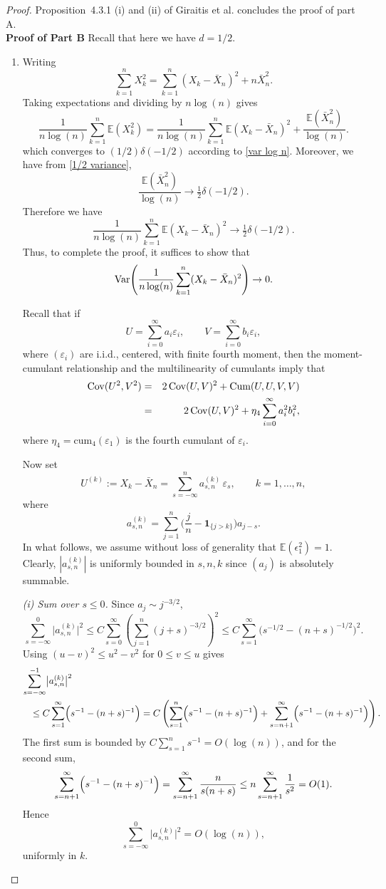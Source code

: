 \documentclass[12pt]{article}
\numberwithin{equation}{section}
\newcommand{\Cov}{{\rm Cov}}
\newcommand{\Var}{{\rm Var}}
\begin{document}
\begin{proof}
  Proposition~4.3.1 (i) and (ii) of Giraitis et al. concludes the proof of part A.\\
  {\bf Proof of Part B} Recall that here we have $d=1/2.$
\begin{enumerate}
    \item
Writing
\[
\sum_{k=1}^n X_k^2
=\sum_{k=1}^n (X_k-\bar X_n)^2+n\bar X_n^2.
\] Taking expectations and dividing by $n\log(n)$ gives
\[
\frac{1}{n\log(n)}\sum_{k=1}^n \mathbb E(X_k^2)
=
\frac{1}{n\log(n)}\sum_{k=1}^n \mathbb E(X_k-\bar X_n)^2
+\frac{\mathbb E(\bar X_n^2)}{\log(n)}.
\]
which converges to $(1/2)\delta(-1/2)$ according to \eqref{var log n}.
Moreover, we have from \eqref{1/2 variance},
\[
\frac{\mathbb E(\bar X_n^2)}{\log(n)}\to \tfrac12\delta(-1/2).
\]
Therefore we have
\[
\frac{1}{n\log(n)}\sum_{k=1}^n \mathbb E(X_k-\bar X_n)^2\to \tfrac12\delta(-1/2).
\]
Thus, to complete the proof, it suffices to show that
\begin{equation}\label{lim var}
\Var\!\left(
\frac{1}{n\log(n)}\sum_{k=1}^n (X_k-\bar X_n)^2
\right)\to0.
\end{equation}

Recall that if
\[
U=\sum_{i=0}^\infty a_i\varepsilon_i,
\qquad
V=\sum_{i=0}^\infty b_i\varepsilon_i,
\]
where $(\varepsilon_i)$ are i.i.d., centered, with finite fourth moment, then  the moment-cumulant relationship and the multilinearity of cumulants imply that
\begin{eqnarray*}
\Cov(U^2,V^2)&=&2\,\Cov(U,V)^2+\textrm{Cum}(U,U,V,V)\\
&=&2\,\Cov(U,V)^2+\eta_4\sum_{i=0}^\infty a_i^2 b_i^2,
\end{eqnarray*}
where $\eta_4=\textrm{cum}_4(\varepsilon_1)$ is the fourth cumulant of $\varepsilon_i$.

Now set
\[
U^{(k)}:=X_k-\bar X_n
=\sum_{s=-\infty}^n a_{s,n}^{(k)}\,\varepsilon_s,
\qquad k=1,\dots,n,
\]
where
\[
a_{s,n}^{(k)}
=\sum_{j=1}^n\Big(\frac{j}{n}-\mathbf 1_{\{j>k\}}\Big)a_{j-s}.
\]
In what follows, we assume without loss of generality that $\mathbb{E}(\epsilon_1^2)=1.$
Clearly, $|a_{s,n}^{(k)}|$ is uniformly bounded in $s,n,k$ since $(a_j)$ is absolutely summable.

\medskip
\noindent\emph{(i) Sum over $s\le0$.}
Since $a_j\sim j^{-3/2}$,
\[
\sum_{s=-\infty}^{0}\bigl|a_{s,n}^{(k)}\bigr|^2
\le
C\sum_{s=0}^{\infty}\left(\sum_{j=1}^{n}(j+s)^{-3/2}\right)^2
\le
C\sum_{s=1}^{\infty}\bigl(s^{-1/2}-(n+s)^{-1/2}\bigr)^2.
\]
Using $(u-v)^2\le u^2-v^2$ for $0\le v\le u$ gives
\begin{eqnarray*}\lefteqn{
\sum_{s=-\infty}^{-1}\bigl|a_{s,n}^{(k)}\bigr|^2}\\
&&\le
C\sum_{s=1}^{\infty}\Bigl(s^{-1}-(n+s)^{-1}\Bigr)
=
C\left(\sum_{s=1}^{n}\Bigl(s^{-1}-(n+s)^{-1}\Bigr)+\sum_{s=n+1}^{\infty}\Bigl(s^{-1}-(n+s)^{-1}\Bigr)\right).
\end{eqnarray*}
The first sum is bounded by $C\sum_{s=1}^{n}s^{-1}=O(\log(n))$, and for the second sum,
\[
\sum_{s=n+1}^{\infty}\Bigl(s^{-1}-(n+s)^{-1}\Bigr)
=\sum_{s=n+1}^\infty \frac{n}{s(n+s)}
\le n\sum_{s=n+1}^\infty \frac{1}{s^2}=O(1).
     \]
Hence
\[
\sum_{s=-\infty}^{0}\bigl|a_{s,n}^{(k)}\bigr|^2=O(\log(n)),
\]
uniformly in $k$.


\end{enumerate}
\end{proof}
\end{document}
